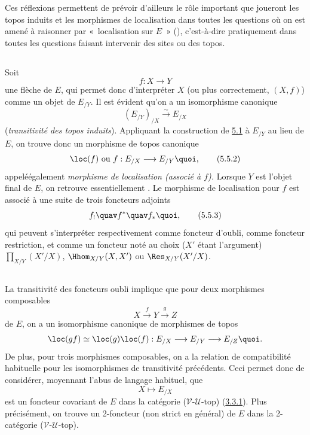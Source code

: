\documentclass[10pt]{../fichiers-configuration-latex/smfart}
\begin{document}
Ces réflexions permettent de prévoir d'ailleurs le rôle
important que joueront les topos induits et les morphismes de
localisation  dans toutes les questions où on est
amené à raisonner par « localisation sur $E$ »  (),
c'est-à-dire pratiquement dans toutes les questions faisant
intervenir des sites ou des topos.

\subsection{}
Soit
$$
f:X\longrightarrow Y
$$
une flèche de $E$, qui permet donc d'interpréter $X$ (ou plus
correctement, $(X,f)$) comme un objet de $E_{/Y}$. Il est évident
qu'on a un isomorphisme canonique
\begin{equation*}
(E_{/Y})_{/X}\xrightarrow{\sim}E_{/X}\tag{5.5.1}
\end{equation*}
(\emph{transitivité des topos induits}). Appliquant la
construction de \hyperref[IV.subsec5.1]{5.1} à $E_{/Y}$ au lieu de $E$, on
trouve donc un morphisme de topos canonique
\begin{equation*}
\loc(f)\mbox{ ou } f:E_{/X}\longrightarrow E_{/Y}{\quoi},\tag{5.5.2}
\end{equation*}
appelé\pageoriginale également \emph{morphisme de localisation
(associé à $f$).} Lorsque $Y$ est l'objet final de $E$, on
retrouve essentiellement . Le morphisme de localisation
pour $f$ est associé à une suite de trois foncteurs adjoints
\begin{equation*}
f_{!}\quav f^{\ast}\quav f_{\ast}{\quoi},\tag{5.5.3}
\end{equation*}
qui peuvent s'interpréter respectivement comme foncteur d'oubli,
comme foncteur restriction, et comme un foncteur noté au choix ($X'$
étant l'argument) $\prod_{X/Y}(X'/X)$, $\Hhom_{X/Y}(X,X')$ ou
$\Res_{X/Y}(X'/X)$.

\subsection{}
La transitivité des foncteurs oubli implique que pour deux
morphismes composables
$$
X\xrightarrow{f} Y \xrightarrow{g} Z
$$
de $E$, on a un isomorphisme canonique de morphismes de topos
$$
\loc(gf)\simeq \loc(g)\loc(f):E_{/X}\longrightarrow
E_{/Y}\longrightarrow E_{/Z}{\quoi}.
$$
De plus, pour trois morphismes composables, on a la relation de
compatibilité habituelle pour les isomorphismes de transitivité
précédents. Ceci permet donc de considérer, moyennant l'abus de
langage habituel, que
$$
X\longmapsto E_{/X}
$$
est un foncteur covariant de $E$ dans la catégorie
($𝒱$-$𝒰$-$\text{top}$) (\hyperref[IV.subsubsec3.3.1]{3.3.1}).
Plus précisément, on trouve un 2-foncteur (non strict en
général) de $E$ dans la 2-catégorie
($𝒱$-$𝒰$-$\text{top}$).
\end{document}
